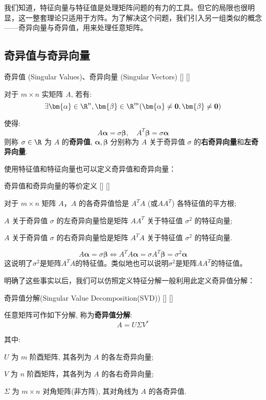 \documentclass[UTF8]{ctexart}
\begin{document}
	我们知道，特征向量与特征值是处理矩阵问题的有力的工具。但它的局限也很明显，这一整套理论只适用于方阵。为了解决这个问题，我们引入另一组类似的概念——奇异向量与奇异值，用来处理任意矩阵。
	\subsection{奇异值与奇异向量}

		\begin{dfn}
			[]
			{奇异值 (Singular Values)、奇异向量 (Singular Vectors)}
			[]
			[]
			
                对于 $m\times n$ 实矩阵 $A$, 若有: 
                \[\exists\bm{\alpha}\in\R^n,\bm{\beta}\in\R^m(\bm{\alpha}\neq\mathbf{0},\bm{\beta}\neq\mathbf{0})\]

                使得: 
                \[A\mathbf{\alpha}=\sigma\mathbf{\beta},\quad A^T\mathbf{\beta}=\sigma\mathbf{\alpha}\]
			则称 $\sigma\in\R$ 为 $A$ 的\textbf{奇异值}, $\bm{\alpha},\bm{\beta}$ 分别称为 $A$ 关于奇异值 $\sigma$ 的\textbf{右奇异向量}和\textbf{左奇异向量}. 
		\end{dfn}

		使用特征值和特征向量也可以定义奇异值和奇异向量：

		\begin{ppt}
			[]
			{奇异值和奇异向量的等价定义}
			[]
			[]
                
			对于 $m\times n$ 矩阵 $A$，$A$ 的各奇异值恰是 $A^TA$ (或$AA^T$) 各特征值的平方根; 

			$A$ 关于奇异值 $\sigma$ 的左奇异向量恰是矩阵 $AA^T$ 关于特征值 $\sigma^2$ 的特征向量; 
                
            $A$ 关于奇异值 $\sigma$ 的右奇异向量恰是矩阵 $A^TA$ 关于特征值 $\sigma^2$ 的特征向量. 
		\end{ppt}

		\begin{prf}
			\[
				A\mathbf{\alpha}=\sigma\mathbf{\beta}\iff A^TA\mathbf{\alpha}=\sigma A^T\mathbf{\beta}=\sigma^2\mathbf{\alpha} 
			\]
			这说明了$\sigma^2$是矩阵$A^TA$的特征值。类似地也可以说明$\sigma^2$是矩阵$AA^T$的特征值。
		\end{prf}

		明确了这些事实以后，我们可以仿照定义特征分解一般利用此定义奇异值分解：

		\begin{thm}
			[]
			{奇异值分解(Singular Value Decomposition(SVD))}
			[]
			[]

			任意矩阵可作如下分解, 称为\textbf{奇异值分解}: 
                \[A=U\Sigma V^*\]
			
                其中: 
                
                $U$ 为 $m$ 阶酉矩阵, 其各列为 $A$ 的各左奇异向量; 
                
                $V$ 为 $n$ 阶酉矩阵，其各列为 $A$ 的各右奇异向量; 
                
                $\Sigma$ 为 $m\times n$ 对角矩阵(非方阵), 其对角线为 $A$ 的各奇异值. 
		\end{thm}
\end{document}
